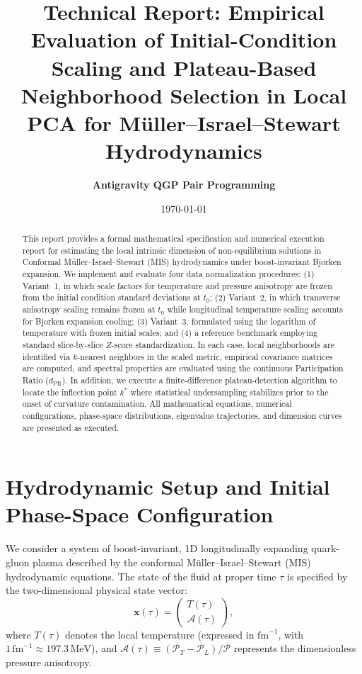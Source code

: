 \documentclass[11pt,a4paper]{article}
\title{\textbf{Technical Report: Empirical Evaluation of Initial-Condition Scaling and Plateau-Based Neighborhood Selection in Local PCA for Müller--Israel--Stewart Hydrodynamics}}
\author{\textbf{Antigravity QGP Pair Programming}}
\date{\today}
\begin{document}
\maketitle

\begin{abstract}
This report provides a formal mathematical specification and numerical execution report for estimating the local intrinsic dimension of non-equilibrium solutions in Conformal Müller--Israel--Stewart (MIS) hydrodynamics under boost-invariant Bjorken expansion. We implement and evaluate four data normalization procedures: (1) Variant~1, in which scale factors for temperature and pressure anisotropy are frozen from the initial condition standard deviations at $t_0$; (2) Variant~2, in which transverse anisotropy scaling remains frozen at $t_0$ while longitudinal temperature scaling accounts for Bjorken expansion cooling; (3) Variant~3, formulated using the logarithm of temperature with frozen initial scales; and (4) a reference benchmark employing standard slice-by-slice $Z$-score standardization. In each case, local neighborhoods are identified via $k$-nearest neighbors in the scaled metric, empirical covariance matrices are computed, and spectral properties are evaluated using the continuous Participation Ratio ($d_{\mathrm{PR}}$). In addition, we execute a finite-difference plateau-detection algorithm to locate the inflection point $k^*$ where statistical undersampling stabilizes prior to the onset of curvature contamination. All mathematical equations, numerical configurations, phase-space distributions, eigenvalue trajectories, and dimension curves are presented as executed.
\end{abstract}

\vspace{0.5em}
\tableofcontents
\newpage

\section{Hydrodynamic Setup and Initial Phase-Space Configuration}
\label{sec:setup}
We consider a system of boost-invariant, 1D longitudinally expanding quark-gluon plasma described by the conformal Müller--Israel--Stewart (MIS) hydrodynamic equations. The state of the fluid at proper time $\tau$ is specified by the two-dimensional physical state vector:
\begin{equation}
    \mathbf{x}(\tau) = \begin{pmatrix} T(\tau) \\ \mathcal{A}(\tau) \end{pmatrix},
    \label{eq:state_vector}
\end{equation}
where $T(\tau)$ denotes the local temperature (expressed in $\mathrm{fm}^{-1}$, with $1\,\mathrm{fm}^{-1} \approx 197.3\,\mathrm{MeV}$), and $\mathcal{A}(\tau) \equiv (\mathcal{P}_T - \mathcal{P}_L)/\mathcal{P}$ represents the dimensionless pressure anisotropy.
\end{document}
